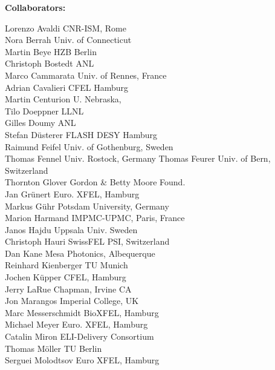\vspace{1\baselineskip}
\noindent\textbf{Collaborators:}\\
\vspace{-1.5\baselineskip}
{\small
\begin{multicols}{2}
\noindent 
	Lorenzo Avaldi \hfill CNR-ISM, Rome\\ 
	Nora Berrah \hfill Univ. of Connecticut\\
	Martin Beye \hfill HZB Berlin\\
	Christoph Bostedt \hfill ANL\\
	Marco Cammarata \hfill Univ. of Rennes, France\\
	Adrian Cavalieri \hfill CFEL Hamburg\\
	Martin Centurion \hfill U. Nebraska,\\
	Tilo Doeppner \hfill LLNL\\
	Gilles Doumy \hfill ANL \\
	Stefan D\"usterer \hfill FLASH DESY Hamburg\\
	Raimund Feifel \hfill Univ. of Gothenburg, Sweden\\
	Thomas Fennel \hfill Univ. Rostock, Germany
	Thomas Feurer \hfill Univ. of Bern, Switzerland\\
	Thornton Glover \hfill Gordon \& Betty Moore Found.\\
	Jan Gr\"unert \hfill Euro. XFEL, Hamburg\\
	Markus G\"uhr \hfill Potsdam University, Germany\\
	Marion Harmand \hfill IMPMC-UPMC, Paris, France\\
	Janos Hajdu \hfill Uppsala Univ. Sweden\\
	Christoph Hauri \hfill SwissFEL PSI, Switzerland\\
	Dan Kane \hfill Mesa Photonics, Albequerque\\
	Reinhard Kienberger \hfill TU Munich\\
	Jochen K\"upper \hfill CFEL, Hamburg\\
	Jerry LaRue \hfill Chapman, Irvine CA\\
	Jon Marangos \hfill Imperial College, UK\\
	Marc Messerschmidt \hfill BioXFEL, Hamburg\\
	Michael Meyer \hfill Euro. XFEL, Hamburg\\
	Catalin Miron \hfill ELI-Delivery Consortium\\
	Thomas M\"oller \hfill TU Berlin\\
	Serguei Molodtsov \hfill Euro XFEL, Hamburg\\

\end{multicols}}
